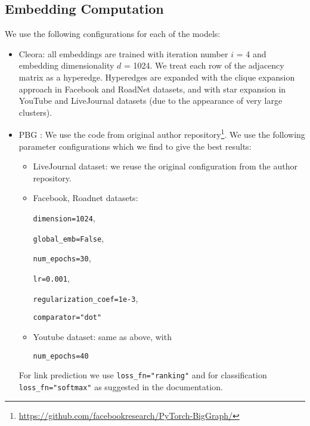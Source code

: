 \documentclass{IEEEtran}
\begin{document}
\subsection{Embedding Computation}
We use the following configurations for each of the models:
\begin{itemize}
    \item Cleora: all embeddings are trained with iteration number $i$ = 4 and embedding dimensionality $d$ = 1024. We treat each row of the adjacency matrix as a hyperedge. Hyperedges are expanded with the clique expansion approach in Facebook and RoadNet datasets, and with star expansion in YouTube and LiveJournal datasets (due to the appearance of very large clusters).
    \item PBG \cite{pbg}: We use the code from original author repository\footnote{\url{https://github.com/facebookresearch/PyTorch-BigGraph/}}. We use the following parameter configurations which we find to give the best results:
    \begin{itemize}
    \item LiveJournal dataset: we reuse the original configuration from the author repository. 
    
    \item Facebook, Roadnet datasets: 
    
        \texttt{dimension=1024},
    
        \texttt{global\_emb=False},
        
        \texttt{num\_epochs=30},
        
        \texttt{lr=0.001},
        
        \texttt{regularization\_coef=1e-3},
        
        \texttt{comparator="dot"}  
        
    \item Youtube dataset: same as above, with
    
    \texttt{num\_epochs=40}
    
    \end{itemize}
    For link prediction we use \texttt{loss\_fn="ranking"} and for classification \texttt{loss\_fn="softmax"} as suggested in the documentation.
    


\end{itemize}
\end{document}
